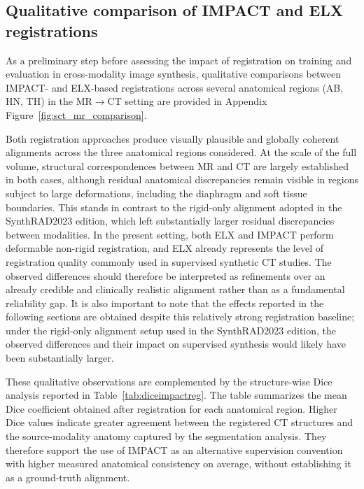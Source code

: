 \documentclass[lettersize,journal]{IEEEtran}
\begin{document}
\subsection{Qualitative comparison of IMPACT and ELX registrations}

As a preliminary step before assessing the impact of registration on training and evaluation in cross-modality image synthesis, qualitative comparisons between IMPACT- and ELX-based registrations across several anatomical regions (AB, HN, TH) in the MR$\rightarrow$CT setting are provided in Appendix Figure~\ref{fig:sct_mr_comparison}.

Both registration approaches produce visually plausible and globally coherent alignments across the three anatomical regions considered. At the scale of the full volume, structural correspondences between MR and CT are largely established in both cases, although residual anatomical discrepancies remain visible in regions subject to large deformations, including the diaphragm and soft tissue boundaries. This stands in contrast to the rigid-only alignment adopted in the SynthRAD2023 edition, which left substantially larger residual discrepancies between modalities. In the present setting, both ELX and IMPACT perform deformable non-rigid registration, and ELX already represents the level of registration quality commonly used in supervised synthetic CT studies. The observed differences should therefore be interpreted as refinements over an already credible and clinically realistic alignment rather than as a fundamental reliability gap. It is also important to note that the effects reported in the following sections are obtained despite this relatively strong registration baseline; under the rigid-only alignment setup used in the SynthRAD2023 edition, the observed differences and their impact on supervised synthesis would likely have been substantially larger.

These qualitative observations are complemented by the structure-wise Dice analysis reported in Table~\ref{tab:diceimpactreg}. The table summarizes the mean Dice coefficient obtained after registration for each anatomical region. Higher Dice values indicate greater agreement between the registered CT structures and the source-modality anatomy captured by the segmentation analysis. They therefore support the use of IMPACT as an alternative supervision convention with higher measured anatomical consistency on average, without establishing it as a ground-truth alignment.
\end{document}
